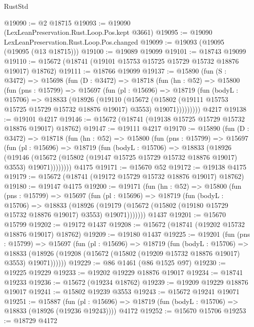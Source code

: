 \begin{lexlean}{RustStd}
\begin{coremodule}
@19090 := @2 @18715
@19093 := @19090 (LexLeanPreservation.Rust.Loop.Pos.kept @3661)
@19095 := @19090 LexLeanPreservation.Rust.Loop.Pos.changed
@19099 := @19093 (@19095 (@19095 (@13 @18715)))
@19100 := @19089 @19099
@19101 := @18743 @19099
@19110 := @15672 (@18741 (@19101 @15753 @15725 @15729 @15732 @18876 @19017) @18762)
@19111 := @18766 @19099
@19137 := @15890
    (fun (S : @3472) =>
    @15698
      (fun (D : @3472) =>
      @18718
        (fun (hn : @52) =>
        @15800
          (fun (pns : @15799) =>
          @15697
            (fun (pl : @15696) =>
            @18719
              (fun (bodyL : @15706) =>
              @18833
                (@18926
                  (@19110
                    (@15672
                      (@15802 (@19111 @15753 @15725 @15729 @15732 @18876 @19017) @3553)
                      @19071)))))))))
    @4217
@19138 := @19101 @4217
@19146 := @15672 (@18741 (@19138 @15725 @15729 @15732 @18876 @19017) @18762)
@19147 := @19111 @4217
@19170 := @15890
    (fun (D : @3472) =>
    @18718
      (fun (hn : @52) =>
      @15800
        (fun (pns : @15799) =>
        @15697
          (fun (pl : @15696) =>
          @18719
            (fun (bodyL : @15706) =>
            @18833
              (@18926
                (@19146
                  (@15672 (@15802 (@19147 @15725 @15729 @15732 @18876 @19017) @3553) @19071))))))))
    @4175
@19171 := @15670 @52
@19172 := @19138 @4175
@19179 := @15672 (@18741 (@19172 @15729 @15732 @18876 @19017) @18762)
@19180 := @19147 @4175
@19200 := @19171
    (fun (hn : @52) =>
    @15800
      (fun (pns : @15799) =>
      @15697
        (fun (pl : @15696) =>
        @18719
          (fun (bodyL : @15706) =>
          @18833
            (@18926
              (@19179 (@15672 (@15802 (@19180 @15729 @15732 @18876 @19017) @3553) @19071)))))))
    @1437
@19201 := @15670 @15799
@19202 := @19172 @1437
@19208 := @15672 (@18741 (@19202 @15732 @18876 @19017) @18762)
@19209 := @19180 @1437
@19225 := @19201
    (fun (pns : @15799) =>
    @15697
      (fun (pl : @15696) =>
      @18719
        (fun (bodyL : @15706) =>
        @18833 (@18926 (@19208 (@15672 (@15802 (@19209 @15732 @18876 @19017) @3553) @19071))))))
@19229 := @86 @1461 (@86 @1525 @97)
@19230 := @19225 @19229
@19233 := @19202 @19229 @18876 @19017
@19234 := @18741 @19233
@19236 := @15672 (@19234 @18762)
@19239 := @19209 @19229 @18876 @19017
@19241 := @15802 @19239 @3553
@19243 := @15672 @19241 @19071
@19251 := @15887
    (fun (pl : @15696) => @18719 (fun (bodyL : @15706) => @18833 (@18926 (@19236 @19243))))
    @4172
@19252 := @15670 @15706
@19253 := @18729 @4172

\end{coremodule}
\end{lexlean}
